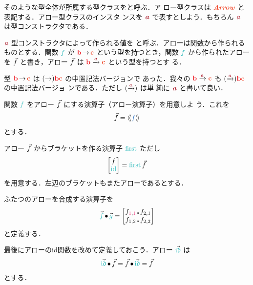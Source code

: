 \documentclass[a5paper,twoside,fleqn,draft]{jsbook}
\begin{document}
そのような型全体が所属する型クラスをと呼ぶ．ア
ロー型クラスは $\mArrowTypeClass$ と表記する．アロー型クラスのインスタ
ンスを $\mTypeConstructor{a}$ で表すとしよう．もちろん
$\mTypeConstructor{a}$ は型コンストラクタである．

$\mTypeConstructor{a}$ 型コンストラクタによって作られる値を
と呼ぶ．アローは関数から作られるものとする．関数 $\hFunc{f}$
が $\hTypeName{b}\hFunctionArrow\mC$ という型を持つとき，関数 $\hFunc{f}$ から作られたアロー
を $\Vec{f}$ と書き，アロー $\Vec{f}$ は
$\hTypeName{b}\mArrowArrow{\mTypeConstructor{a}}\mC$ という型を持つとす
る．

型 $\hTypeName{b}\hFunctionArrow\mC$ は $(\hFunctionArrow)\hTypeName{b}\mC$ の中置記法バージョンで
あった．我々の $\hTypeName{b}\mArrowArrow{\mTypeConstructor{a}}\mC$ も
$(\mArrowArrow{\mTypeConstructor{a}})\hTypeName{b}\mC$ の中置記法バージョ
ンである．ただし $(\mArrowArrow{\mTypeConstructor{a}})$ は単
純に $\mTypeConstructor{a}$ と書いて良い．

\separator

関数 $\hFunc{f}$ をアロー $\Vec{f}$ にする演算子（アロー演算子）を用意しよ
う．これを
\begin{equation}
  \mArrow{f}
  =\mArrowWith{f}
\end{equation}
とする．

アロー $\Vec{f}$ からブラケットを作る演算子 $\mFirst$ ただし
\begin{equation}
  \begin{bmatrix}
    f\\
    \mId
  \end{bmatrix}
  =
  \mFirst\mArrow{f}
\end{equation}
を用意する．左辺のブラケットもまたアローであるとする．

ふたつのアローを合成する演算子を
\begin{equation}
  \mArrow{\hFunc{f}}\mCompCat\mArrow{\hFunc{g}}
  =
  \begin{bmatrix}
    f_{\hConstant{1},\hConstant{1}}\hCompose f_{2,1}\\
    f_{1,2}\hCompose f_{2,2}
  \end{bmatrix}
\end{equation}
と定義する．

最後にアローのid関数を改めて定義しておこう．アロー $\mArrow{\mIdCat}$
は
\begin{equation}
  \mArrow{\mIdCat}\mCompCat\mArrow{f}
  =\mArrow{f}\mCompCat\mArrow{\mIdCat}
  =\mArrow{f}
\end{equation}
とする．
\end{document}
